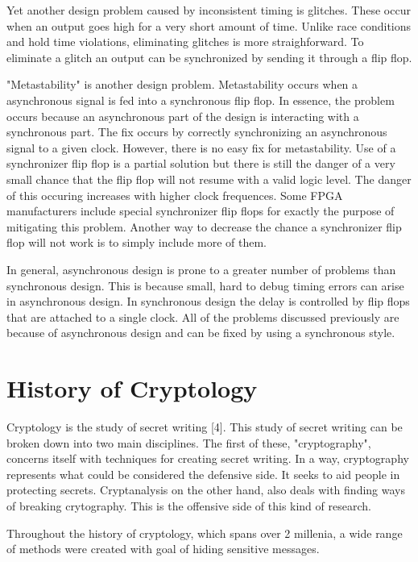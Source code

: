 \documentclass{article}
\begin{document}
    Yet another design problem caused by inconsistent timing is glitches. These occur
    when an output goes high for a very short amount of time. Unlike race conditions
    and hold time violations, eliminating glitches is more straighforward.
    To eliminate a glitch an output can be synchronized by sending it through a flip flop.

    "Metastability" is another design problem. Metastability occurs when a asynchronous
    signal is fed into a synchronous flip flop. In essence, the problem occurs because
    an asynchronous part of the design is interacting with a synchronous part.
    The fix occurs by correctly synchronizing an asynchronous signal to a given clock.
    However, there is no easy fix for metastability. Use of a synchronizer flip flop
    is a partial solution but there is still the danger of a very small chance
    that the flip flop will not resume with a valid logic level. The danger of this occuring
    increases with higher clock frequences. Some FPGA manufacturers include special
    synchronizer flip flops for exactly the purpose of mitigating this problem.
    Another way to decrease the chance a synchronizer flip flop will not work is
    to simply include more of them.

    In general, asynchronous design is prone to a greater number of problems
    than synchronous design. This is because small, hard to debug timing errors
    can arise in asynchronous design.
    In synchronous design the delay is controlled by flip flops that are attached
    to a single clock.
    All of the problems discussed previously are because of asynchronous design
    and can be fixed by using a synchronous style.

    \section{History of Cryptology}

    Cryptology is the study of secret writing [4]. This study of secret writing
    can be broken down into two main disciplines.
    The first of these, "cryptography", concerns itself with techniques
    for creating secret writing. In a way, cryptography represents what could
    be considered the defensive side. It seeks to aid people in
    protecting secrets.
    Cryptanalysis on the other hand, also deals with finding ways of breaking
    crytography. This is the offensive side of this kind of research.

    Throughout the history of cryptology, which spans over 2 millenia,
    a wide range of methods were created with goal of hiding sensitive
    messages.
\end{document}

